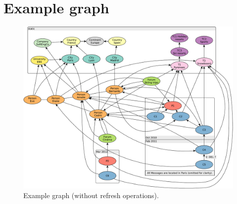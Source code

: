 \chapter{Example graph}
\label{sec:example-graph}

\begin{figure}[ht]
    \centering
    \includegraphics[scale=\yedscale]{figures/example-graph-without-refreshes}
    \caption{Example graph (without refresh operations).}
    \label{fig:example-graph-without-refreshes}
\end{figure}

